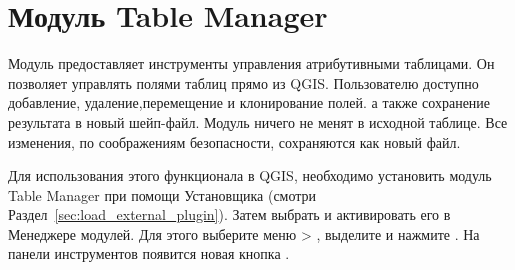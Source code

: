 
\section{Модуль Table Manager}\label{sec:ftools}


Модуль предоставляет инструменты управления атрибутивными таблицами. Он
позволяет управлять полями таблиц прямо из QGIS. Пользователю доступно
добавление, удаление,перемещение и клонирование полей. а также сохранение
результата в новый шейп-файл. Модуль ничего не менят в исходной таблице.
Все изменения, по соображениям безопасности, сохраняются как новый файл.


Для использования этого функционала в QGIS, необходимо установить модуль
Table Manager при помощи  Установщика
(смотри Раздел~\ref{sec:load_external_plugin}). Затем выбрать и
активировать его в Менеджере модулей.  Для этого выберите меню
 > , выделите
 и нажмите . На панели
инструментов появится новая кнопка .
